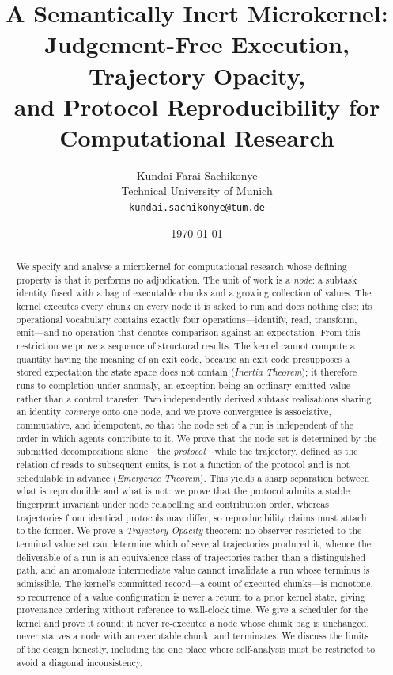 \documentclass[11pt,a4paper]{article}
\title{\textbf{A Semantically Inert Microkernel:\\[2pt]
Judgement-Free Execution, Trajectory Opacity,\\
and Protocol Reproducibility for Computational Research}}
\author{%
Kundai Farai Sachikonye\\
\small Technical University of Munich\\
\small \texttt{kundai.sachikonye@tum.de}}
\date{\today}
\theoremstyle{thmstyle}
\theoremstyle{definition}
\theoremstyle{remark}
\begin{document}
\maketitle

\begin{abstract}
\noindent
We specify and analyse a microkernel for computational research whose
defining property is that it performs no adjudication. The unit of work is a
\emph{node}: a subtask identity fused with a bag of executable chunks and a
growing collection of values. The kernel executes every chunk on every node
it is asked to run and does nothing else; its operational vocabulary
contains exactly four operations---identify, read, transform, emit---and no
operation that denotes comparison against an expectation. From this
restriction we prove a sequence of structural results. The kernel cannot
compute a quantity having the meaning of an exit code, because an exit code
presupposes a stored expectation the state space does not contain
\textup{(}\emph{Inertia Theorem}\textup{)}; it therefore runs to completion
under anomaly, an exception being an ordinary emitted value rather than a
control transfer. Two independently derived subtask realisations sharing an
identity \emph{converge} onto one node, and we prove convergence is
associative, commutative, and idempotent, so that the node set of a run is
independent of the order in which agents contribute to it. We prove that the
node set is determined by the submitted decompositions alone---the
\emph{protocol}---while the trajectory, defined as the relation of reads to
subsequent emits, is not a function of the protocol and is not schedulable
in advance \textup{(}\emph{Emergence Theorem}\textup{)}. This yields a
sharp separation between what is reproducible and what is not: we prove that
the protocol admits a stable fingerprint invariant under node relabelling
and contribution order, whereas trajectories from identical protocols may
differ, so reproducibility claims must attach to the former. We prove a
\emph{Trajectory Opacity} theorem: no observer restricted to the terminal
value set can determine which of several trajectories produced it, whence
the deliverable of a run is an equivalence class of trajectories rather than
a distinguished path, and an anomalous intermediate value cannot invalidate
a run whose terminus is admissible. The kernel's committed record---a count
of executed chunks---is monotone, so recurrence of a value configuration is
never a return to a prior kernel state, giving provenance ordering without
reference to wall-clock time. We give a scheduler for the kernel and prove
it sound: it never re-executes a node whose chunk bag is unchanged, never
starves a node with an executable chunk, and terminates. We discuss the
limits of the design honestly, including the one place where self-analysis
must be restricted to avoid a diagonal inconsistency.
\end{abstract}
\end{document}
